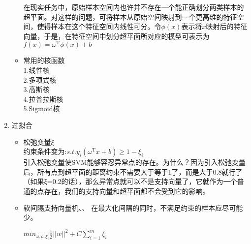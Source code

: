 \begin{enumerate}
\begin{itemize}
		在现实任务中，原始样本空间内也许并不存在一个能正确划分两类样本的超平面。对这样的问题，可将样本从原始空间映射到一个更高维的特征空间，使得样本在这个特征空间内线性可分。令$\phi(x)$表示将$x$映射后的特征向量，于是，在特征空间中划分超平面所对应的模型可表示为$f(x)=\omega^\mathrm{T}\phi(x)+b$
		\item 常用的核函数\\
		1.线性核\\
		2.多项式核\\
		3.高斯核\\
		4.拉普拉斯核\\
		5.Sigmoid核\\
	\end{itemize}
	\item 过拟合
	\begin{itemize}
		\item 松弛变量$\xi$\\
		约束条件变为:$s.t. y_i(\omega^\mathrm{T}x+b)\geq 1-\xi_i$\\
		引入松弛变量使SVM能够容忍异常点的存在。为什么？因为引入松弛变量后，所有点到超平面的距离约束不需要大于等于1了，而是大于0.8就行了（如果ξ=0.2的话），那么异常点就可以不是支持向量了，它就作为一个普通的点存在，我们的支持向量和超平面都不会受到它的影响。
		\item 软间隔支持向量机、、
		在最大化间隔的同时，不满足约束的样本应尽可能少。\\
		\begin{center}
			$min_{\omega,b,\xi_i} \frac{1}{2} ||w||^{2}+C\sum_{i=1}^{m}\xi_i$
		\end{center}	
	\end{itemize}
\end{enumerate}
